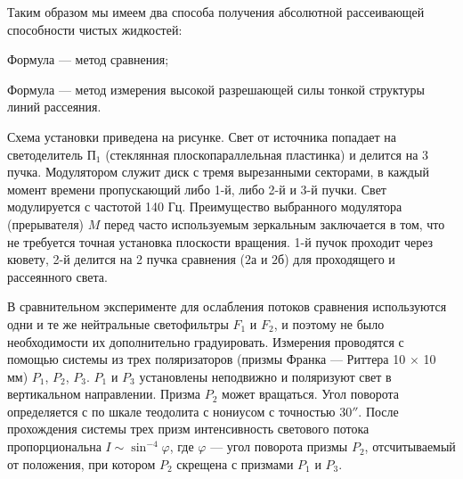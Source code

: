 Таким образом мы имеем два способа получения абсолютной рассеивающей способности чистых жидкостей:

Формула  --- метод сравнения;

Формула  --- метод измерения высокой разрешающей силы тонкой структуры
линий рассеяния.



Схема установки приведена на рисунке. Свет от источника попадает
на светоделитель $П_1$ (стеклянная плоскопараллельная пластинка)
и делится на 3 пучка. Модулятором служит диск с тремя вырезанными
секторами, в каждый момент времени пропускающий либо 1-й, либо
2-й и 3-й пучки. Свет модулируется с частотой 140 Гц.
Преимущество выбранного модулятора (прерывателя) $M$ перед часто
используемым зеркальным заключается в том, что не требуется
точная установка плоскости вращения. 1-й пучок проходит через
кювету, 2-й делится на 2 пучка сравнения ($2а$ и $2б$) для
проходящего и рассеянного света.

В сравнительном эксперименте для ослабления потоков сравнения
используются одни и те же нейтральные светофильтры $F_1$ и $F_2$,
и поэтому не было необходимости их дополнительно градуировать.
Измерения проводятся с помощью системы из трех поляризаторов
(призмы Франка --- Риттера 10 $\times$ 10 мм) $P_1$, $P_2$,
$P_3$. $P_1$ и $P_3$ установлены неподвижно и поляризуют свет в
вертикальном направлении. Призма $P_2$ может вращаться. Угол
поворота определяется с по шкале теодолита с нониусом с точностью
30$''$. После прохождения системы трех призм интенсивность
светового потока пропорциональна $I\sim\sin^{-4}\varphi$, где
$\varphi$ --- угол поворота призмы $P_2$, отсчитываемый от
положения, при котором $P_2$ скрещена с призмами $P_1$ и $P_3$.

